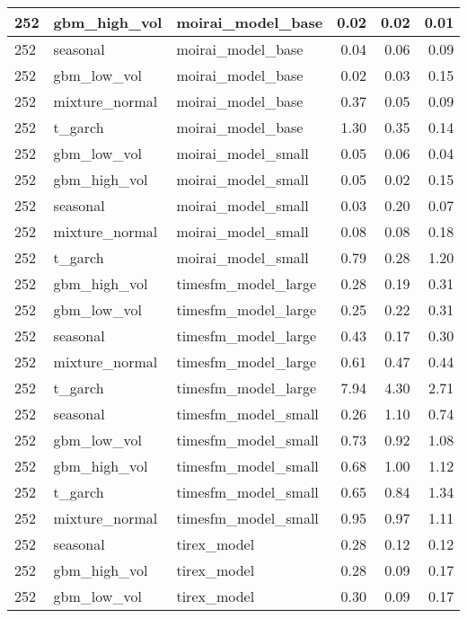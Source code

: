 {\begin{tabular}{lllrrr}
\midrule
252 & gbm\_high\_vol & moirai\_model\_base & 0.02 & 0.02 & 0.01 \\
\midrule
252 & seasonal & moirai\_model\_base & 0.04 & 0.06 & 0.09 \\
\midrule
252 & gbm\_low\_vol & moirai\_model\_base & 0.02 & 0.03 & 0.15 \\
\midrule
252 & mixture\_normal & moirai\_model\_base & 0.37 & 0.05 & 0.09 \\
\midrule
252 & t\_garch & moirai\_model\_base & 1.30 & 0.35 & 0.14 \\
\midrule
252 & gbm\_low\_vol & moirai\_model\_small & 0.05 & 0.06 & 0.04 \\
\midrule
252 & gbm\_high\_vol & moirai\_model\_small & 0.05 & 0.02 & 0.15 \\
\midrule
252 & seasonal & moirai\_model\_small & 0.03 & 0.20 & 0.07 \\
\midrule
252 & mixture\_normal & moirai\_model\_small & 0.08 & 0.08 & 0.18 \\
\midrule
252 & t\_garch & moirai\_model\_small & 0.79 & 0.28 & 1.20 \\
\midrule
252 & gbm\_high\_vol & timesfm\_model\_large & 0.28 & 0.19 & 0.31 \\
\midrule
252 & gbm\_low\_vol & timesfm\_model\_large & 0.25 & 0.22 & 0.31 \\
\midrule
252 & seasonal & timesfm\_model\_large & 0.43 & 0.17 & 0.30 \\
\midrule
252 & mixture\_normal & timesfm\_model\_large & 0.61 & 0.47 & 0.44 \\
\midrule
252 & t\_garch & timesfm\_model\_large & 7.94 & 4.30 & 2.71 \\
\midrule
252 & seasonal & timesfm\_model\_small & 0.26 & 1.10 & 0.74 \\
\midrule
252 & gbm\_low\_vol & timesfm\_model\_small & 0.73 & 0.92 & 1.08 \\
\midrule
252 & gbm\_high\_vol & timesfm\_model\_small & 0.68 & 1.00 & 1.12 \\
\midrule
252 & t\_garch & timesfm\_model\_small & 0.65 & 0.84 & 1.34 \\
\midrule
252 & mixture\_normal & timesfm\_model\_small & 0.95 & 0.97 & 1.11 \\
\midrule
252 & seasonal & tirex\_model & 0.28 & 0.12 & 0.12 \\
\midrule
252 & gbm\_high\_vol & tirex\_model & 0.28 & 0.09 & 0.17 \\
\midrule
252 & gbm\_low\_vol & tirex\_model & 0.30 & 0.09 & 0.17 \\

\end{tabular}}
